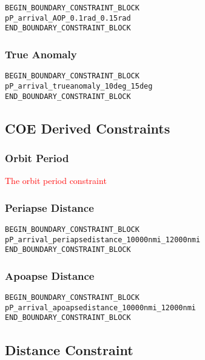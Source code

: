 \documentclass[11pt]{article}
\begin{document}
\begin{verbatim}
BEGIN_BOUNDARY_CONSTRAINT_BLOCK
pP_arrival_AOP_0.1rad_0.15rad
END_BOUNDARY_CONSTRAINT_BLOCK
\end{verbatim}

\subsubsection{True Anomaly}
\label{sec:boundaryTAconstraint}

\begin{verbatim}
BEGIN_BOUNDARY_CONSTRAINT_BLOCK
pP_arrival_trueanomaly_10deg_15deg
END_BOUNDARY_CONSTRAINT_BLOCK
\end{verbatim}

\subsection{COE Derived Constraints}
\label{sec:boundaryCOEderivedConstraints}

\subsubsection{Orbit Period}
\label{sec:boundaryOrbitPeriod}

\textcolor{red}{The orbit period constraint}

\subsubsection{Periapse Distance}
\label{sec:boundaryOrbitPeriapse}

\begin{verbatim}
BEGIN_BOUNDARY_CONSTRAINT_BLOCK
pP_arrival_periapsedistance_10000nmi_12000nmi
END_BOUNDARY_CONSTRAINT_BLOCK
\end{verbatim}

\subsubsection{Apoapse Distance}
\label{sec:boundaryOrbitApoapse}

\begin{verbatim}
BEGIN_BOUNDARY_CONSTRAINT_BLOCK
pP_arrival_apoapsedistance_10000nmi_12000nmi
END_BOUNDARY_CONSTRAINT_BLOCK
\end{verbatim}

\subsection{Distance Constraint}
\label{sec:boundaryDistanceConstraint}
\end{document}
